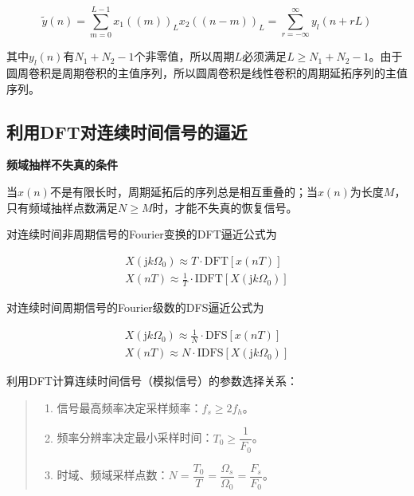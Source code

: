 \documentclass[cn, hazy, blue, normal, 14pt]{elegantnote}
\begin{document}
\begin{equation}
    \widetilde{y}(n)=\sum_{m=0}^{L-1}{x_1((m))_L x_2((n-m))_L}=\sum_{r=-\infty}^{\infty}{y_l(n+rL)}
\end{equation}

其中$y_l(n)$有$N_1+N_2-1$个非零值，所以周期$L$必须满足$L\geq N_1+N_2-1$。由于圆周卷积是周期卷积的主值序列，所以圆周卷积是线性卷积的周期延拓序列的主值序列。

\subsection{利用DFT对连续时间信号的逼近}

\textbf{频域抽样不失真的条件}

当$x(n)$不是有限长时，周期延拓后的序列总是相互重叠的；当$x(n)$为长度$M$，只有频域抽样点数满足$N\geq M$时，才能不失真的恢复信号。

对连续时间非周期信号的Fourier变换的DFT逼近公式为

\begin{equation}
\begin{aligned}
    X(\text{j}k\Omega_0)\approx T\cdot \text{DFT}[x(nT)] \\
    X(nT)\approx \frac{1}{T}\cdot \text{IDFT}[X(\text{j}k\Omega_0)]
\end{aligned}
\end{equation}

对连续时间周期信号的Fourier级数的DFS逼近公式为

\begin{equation}
\begin{aligned}
    X(\text{j}k\Omega_0)\approx \frac{1}{N}\cdot \text{DFS}[x(nT)] \\
    X(nT)\approx N\cdot \text{IDFS}[X(\text{j}k\Omega_0)]
\end{aligned}
\end{equation}

利用DFT计算连续时间信号（模拟信号）的参数选择关系：

\begin{quote}
\begin{enumerate}
    \item 信号最高频率决定采样频率：$f_s\geq 2f_h$。
    \item 频率分辨率决定最小采样时间：$T_0\geq \dfrac{1}{F_0}$。
    \item 时域、频域采样点数：$N=\dfrac{T_0}{T}=\dfrac{\Omega_s}{\Omega_0}=\dfrac{F_s}{F_0}$。
\end{enumerate}
\end{quote}
\end{document}
